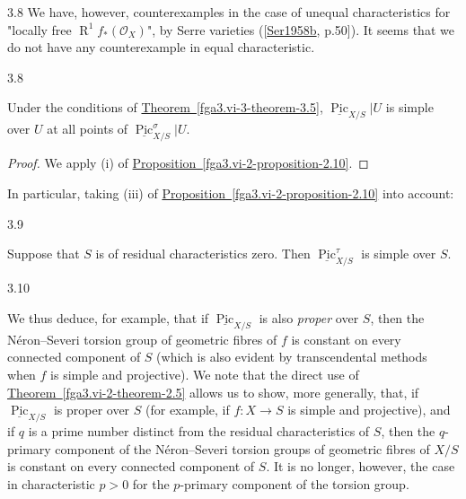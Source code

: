 \begin{remark}{3.8}
    We have, however, counterexamples in the case of unequal characteristics for "locally free \(\operatorname {R}^1f_*(\mathcal {O}_X)\)", by Serre varieties ([\hyperref[Ser1958b]{Ser1958b}, p.50]).
    It seems that we do not have any counterexample in equal characteristic.\end{remark}\begin{corollary}{3.8}\label{fga3.vi-3-corollary-3.8}\skipsinglepar\par{}Under the conditions of \hyperref[fga3.vi-3-theorem-3.5]{Theorem~\ref*{fga3.vi-3-theorem-3.5}}, \(\underline {\operatorname {Pic}}_{X/S}|U\) is simple over \(U\) at all points of \(\underline {\operatorname {Pic}}_{X/S}^\sigma |U\).\begin{proof}\par{}We apply (i) of \hyperref[fga3.vi-2-proposition-2.10]{Proposition~\ref*{fga3.vi-2-proposition-2.10}}.\end{proof}\end{corollary}\par{}In particular, taking (iii) of \hyperref[fga3.vi-2-proposition-2.10]{Proposition~\ref*{fga3.vi-2-proposition-2.10}} into account:\begin{corollary}{3.9}\label{fga3.vi-3-corollary-3.9}\skipsinglepar\par{}Suppose that \(S\) is of residual characteristics zero.
    Then \(\underline {\operatorname {Pic}}_{X/S}^\tau \) is simple over \(S\).\end{corollary}\begin{remark}{3.10}\label{fga3.vi-3-remark-3.10}\skipsinglepar\par{}We thus deduce, for example, that if \(\underline {\operatorname {Pic}}_{X/S}\) is also \emph{proper} over \(S\), then the Néron–Severi torsion group of geometric fibres of \(f\) is constant on every connected component of \(S\) (which is also evident by transcendental methods when \(f\) is simple and projective).
    We note that the direct use of \hyperref[fga3.vi-2-theorem-2.5]{Theorem~\ref*{fga3.vi-2-theorem-2.5}} allows us to show, more generally, that, if \(\underline {\operatorname {Pic}}_{X/S}\) is proper over \(S\) (for example, if \(f\colon  X\to  S\) is simple and projective), and if \(q\) is a prime number distinct from the residual characteristics of \(S\), then the \(q\)-primary component of the Néron–Severi torsion groups of geometric fibres of \(X/S\) is constant on every connected component of \(S\).
    It is no longer, however, the case in characteristic \(p>0\) for the \(p\)-primary component of the torsion group.

\end{remark}
